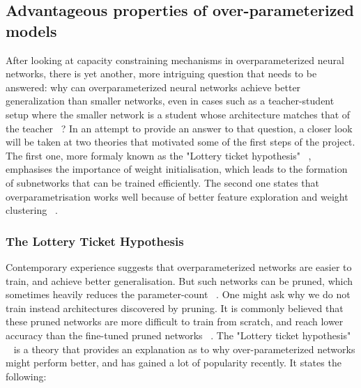 \subsection{Advantageous properties of over-parameterized models}
After looking at capacity constraining mechanisms in overparameterized neural networks, there is yet another, more intriguing question that needs to be answered: why can overparameterized neural networks achieve better generalization than smaller networks, even in cases such as a teacher-student setup where the smaller network is a student whose architecture matches that of the teacher ~\autocite{tian2019luck}? In an attempt to provide an answer to that question, a closer look will be taken at two theories that motivated some of the first steps of the project. The first one, more formaly known as the "Lottery ticket hypothesis" ~\autocite{frankle2018lottery}, emphasises the importance of weight initialisation, which leads to the formation of subnetworks that can be trained efficiently. The second one states that overparametrisation works well because of better feature exploration and weight clustering ~\autocite{brutzkus2019larger}.


\subsubsection*{The Lottery Ticket Hypothesis}
Contemporary experience suggests that overparameterized networks are easier to train, and achieve better generalisation. But such networks can be pruned, which sometimes heavily reduces the parameter-count ~\autocite{han2015learning}. One might ask why we do not train instead architectures discovered by pruning. It is commonly believed that these pruned networks are more difficult to train from scratch, and reach lower accuracy than the fine-tuned pruned networks ~\autocite{li2016pruning}. The "Lottery ticket hypothesis" ~\autocite{frankle2018lottery} is a theory that provides an explanation as to why over-parameterized networks might perform better, and has gained a lot of popularity recently. It states the following: \\

